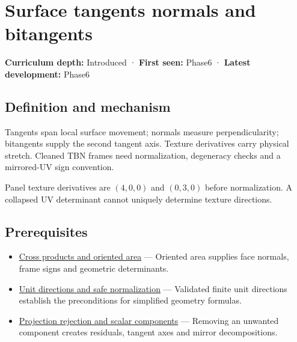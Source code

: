 \hypertarget{appendix-e31893dec985}{}\label{referencestart:appendix-e31893dec985}
\section{Surface tangents normals and bitangents}\label{appendix-e31893dec985-surface-tangents-normals-and-bitangents}

\hypertarget{appendix-e31893dec985-surface-tangents-normals-and-bitangents}{}

\textbf{Curriculum depth:} Introduced · \textbf{First seen:} Phase6 · \textbf{Latest development:} Phase6

\begin{allmightroledefinition}

\subsection{Definition and mechanism}\label{appendix-e31893dec985-definition-and-mechanism}

\hypertarget{appendix-e31893dec985-definition-and-mechanism}{}

Tangents span local surface movement; normals measure perpendicularity; bitangents supply the second tangent axis. Texture derivatives carry physical stretch. Cleaned TBN frames need normalization, degeneracy checks and a mirrored-UV sign convention.

\end{allmightroledefinition}

Panel texture derivatives are \((4,0,0)\) and \((0,3,0)\) before normalization. A collapsed UV determinant cannot uniquely determine texture directions.

\subsection{Prerequisites}\label{appendix-e31893dec985-prerequisites}

\hypertarget{appendix-e31893dec985-prerequisites}{}

\begin{itemize}
\tightlist
\item
  \hyperref[appendix-2391db8052b1]{Cross products and oriented area} --- Oriented area supplies face normals, frame signs and geometric determinants.
\item
  \hyperref[appendix-f744e41b95b4]{Unit directions and safe normalization} --- Validated finite unit directions establish the preconditions for simplified geometry formulas.
\item
  \hyperref[appendix-505a502c372a]{Projection rejection and scalar components} --- Removing an unwanted component creates residuals, tangent axes and mirror decompositions.
\end{itemize}

